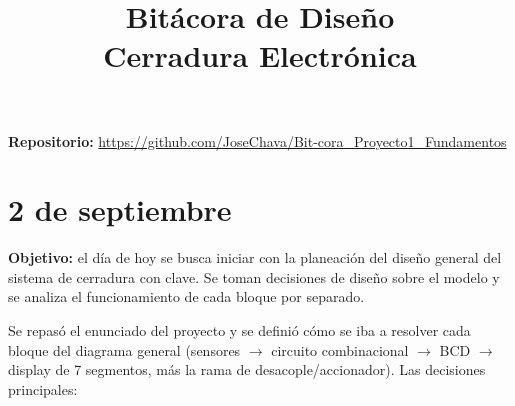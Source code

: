 \documentclass[10pt,conference]{IEEEtran}
\begin{document}
	
	\title{Bit\'acora de Dise\~no\\ Cerradura Electr\'onica}
	
	\author{
	}
	
	\maketitle
	
	\noindent\textbf{Repositorio:} \url{https://github.com/JoseChava/Bit-cora_Proyecto1_Fundamentos}
	
	\maketitle
	
	\section{2 de septiembre}
	\textbf{Objetivo:} el d\'ia de hoy se busca iniciar con la planeaci\'on del dise\~no general del
	sistema de cerradura con clave. Se toman decisiones de dise\~no sobre el modelo y se analiza el
	funcionamiento de cada bloque por separado.
	
	Se repas\'o el enunciado del proyecto y se defini\'o c\'omo se iba a resolver cada bloque del
	diagrama general (sensores $\rightarrow$ circuito combinacional $\rightarrow$ BCD $\rightarrow$
	display de 7 segmentos, m\'as la rama de desacople/accionador). Las decisiones principales:
	
\end{document}

